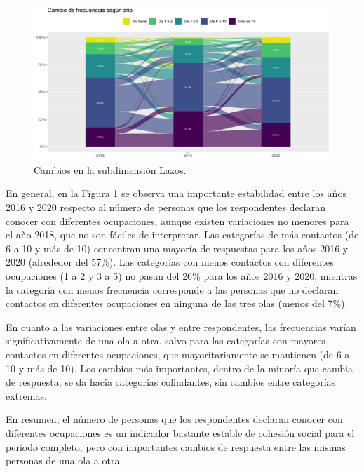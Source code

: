 \documentclass[
  12pt,
]{book}
\begin{document}
\begin{figure}[H]

{\centering \includegraphics[width=1\linewidth,height=1\textheight]{output/graphs/alluvial_lazos} 

}

\caption{Cambios en la subdimensión Lazos.}\label{fig:alluvial-lazos}
\end{figure}

En general, en la Figura \ref{fig:alluvial-lazos} se observa una importante estabilidad entre los años 2016 y 2020 respecto al número de personas que los respondentes declaran conocer con diferentes ocupaciones, aunque existen variaciones no menores para el año 2018, que no son fáciles de interpretar. Las categorías de más contactos (de 6 a 10 y más de 10) concentran una mayoría de respuestas para los años 2016 y 2020 (alrededor del 57\%). Las categorías con menos contactos con diferentes ocupaciones (1 a 2 y 3 a 5) no pasan del 26\% para los años 2016 y 2020, mientras la categoría con menos frecuencia corresponde a las personas que no declaran contactos en diferentes ocupaciones en ninguna de las tres olas (menos del 7\%).

En cuanto a las variaciones entre olas y entre respondentes, las frecuencias varían significativamente de una ola a otra, salvo para las categorías con mayores contactos en diferentes ocupaciones, que mayoritariamente se mantienen (de 6 a 10 y más de 10). Los cambios más importantes, dentro de la minoría que cambia de respuesta, se da hacia categorías colindantes, sin cambios entre categorías extremas.

En resumen, el número de personas que los respondentes declaran conocer con diferentes ocupaciones es un indicador bastante estable de cohesión social para el período completo, pero con importantes cambios de respuesta entre las mismas personas de una ola a otra.
\end{document}

